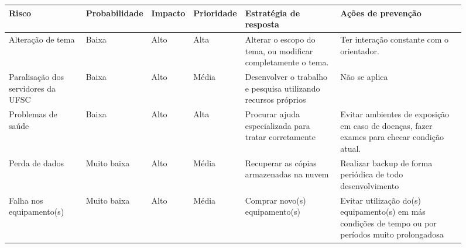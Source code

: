 \documentclass{ufsctex/ufsctex}
\begin{document}
\begin{figure}[htbp]
  \footnotesize
    \begin{tabular}{|P{1.3cm}|*{3}{P{0.8cm}|}*{2}{P{2.24cm}|}}
    \hline {}
    \textbf{Risco} & \textbf{Proba\-bilidade} & \textbf{Impacto}
      & \textbf{Priori\-dade} & \textbf{Estratégia de resposta}
      & \textbf{Ações de prevenção} \\
	\hline Alteração de tema & Baixa & Alto & Alta
	  & Alterar o escopo do tema, ou modificar completamente o tema.
	  & Ter interação constante com o orientador. \\
    \hline Paralisação dos servidores da UFSC & Baixa & Alto & Média
	  & Desenvolver o trabalho e pesquisa utilizando recursos próprios
      & Não se aplica \\
    \hline Problemas de saúde & Baixa & Alto & Alta
	  & Procurar ajuda especializada para tratar corretamente
	  & Evitar ambientes de exposição em caso de doenças, fazer exames
		para checar condição atual. \\
    \hline Perda de dados  & Muito baixa & Alto & Média
      & Recuperar as cópias armazenadas na nuvem
	  & Realizar backup de forma periódica de todo desenvolvimento \\
    \hline Falha nos equipamento(s) & Muito baixa & Alto & Média
      & Comprar novo(s) equipamento(s)
      & Evitar utilização do(s) equipamento(s) em más condições de tempo ou
        por períodos muito prolongadosa \\
    \hline
  \end{tabular}
\end{figure}



\end{document}
